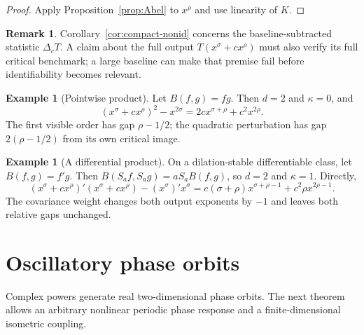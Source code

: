 \documentclass[11pt,a4paper]{amsart}
\theoremstyle{definition}
\newtheorem{example}[theorem]{Example}
\newtheorem{remark}[theorem]{Remark}
\begin{document}
\begin{proof}
Apply Proposition~\ref{prop:Abel} to $x^\rho$ and use linearity of $K$.
\end{proof}

\begin{remark}\label{rem:full-output}
Corollary~\ref{cor:compact-nonid} concerns the baseline-subtracted statistic $\Delta_cT$.  A claim about the full output $T(x^\sigma+cx^\rho)$ must also verify its full critical benchmark; a large baseline can make that premise fail before identifiability becomes relevant.
\end{remark}

\begin{example}[Pointwise product]\label{ex:product}
Let $B(f,g)=fg$.  Then $d=2$ and $\kappa=0$, and
\[
 (x^\sigma+cx^\rho)^2-x^{2\sigma}
 =2c x^{\sigma+\rho}+c^2x^{2\rho}.
\]
The first visible order has gap $\rho-1/2$; the quadratic perturbation has gap $2(\rho-1/2)$ from its own critical image.
\end{example}

\begin{example}[A differential product]\label{ex:differential}
On a dilation-stable differentiable class, let $B(f,g)=f'g$.  Then
$B(S_af,S_ag)=aS_aB(f,g)$, so $d=2$ and $\kappa=1$.  Directly,
\[
 (x^\sigma+cx^\rho)'(x^\sigma+cx^\rho)
 -(x^\sigma)'x^\sigma
 =c(\sigma+\rho)x^{\sigma+\rho-1}
  +c^2\rho x^{2\rho-1}.
\]
The covariance weight changes both output exponents by $-1$ and leaves both relative gaps unchanged.
\end{example}

\section{Oscillatory phase orbits}\label{sec:phase}

Complex powers generate real two-dimensional phase orbits.  The next theorem allows an arbitrary nonlinear periodic phase response and a finite-dimensional isometric coupling.
\end{document}
